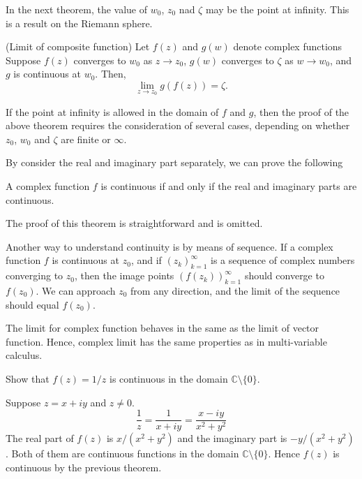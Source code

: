 In the next theorem, the value of $w_0$, $z_0$ nad $\zeta$ may be the point at infinity. This is a result on the Riemann sphere.

\begin{svgraybox}
	\begin{theorem} (Limit of composite function)
		Let $f(z)$ and $g(w)$ denote complex functions Suppose $f(z)$ converges to $w_0$ as $z\rightarrow z_0$, $g(w)$ converges to $\zeta$ as $w\rightarrow w_0$, and $g$ is continuous at $w_0$. Then, 
		$$
		\lim_{z\rightarrow z_0} g(f(z)) = \zeta.
		$$
	\end{theorem}
\end{svgraybox}

If the point at infinity is allowed in the domain of $f$ and $g$, then the proof of the above theorem requires the consideration of several cases, depending on whether $z_0$, $w_0$ and $\zeta$ are finite or $\infty$.

By consider the real and imaginary part separately, we can prove the following

\begin{svgraybox}
	\begin{theorem}
		A complex function $f$ is continuous if and only if the real and imaginary parts are continuous.
	\end{theorem}
\end{svgraybox}

The proof of this theorem is straightforward and is omitted.

Another way to understand continuity is by means of sequence. If a complex function $f$ is continuous at $z_0$, and if $(z_k)_{k=1}^\infty$ is a sequence of complex numbers converging to $z_0$, then the image points $(f(z_k))_{k=1}^\infty$ should converge to $f(z_0)$. We can approach $z_0$ from any direction, and the limit of the sequence should equal $f(z_0)$.




The limit for complex function behaves in the same as the limit of vector function. Hence, complex limit has the same properties as in multi-variable calculus.  







\begin{example} Show that $f(z) = 1/z$ is continuous in the domain $\mathbb{C}\setminus\{0\}$.
	
	Suppose $z=x+iy$ and $z\neq 0$.
	\[
	\frac{1}{z} = \frac{1}{x+iy} 
	= \frac{x-iy}{x^2+y^2} 
	\]
	The real part of $f(z)$ is $x/(x^2+y^2)$ and the imaginary part is $-y/(x^2+y^2)$. Both of them are continuous functions in the domain $\mathbb{C}\setminus\{0\}$. Hence $f(z)$ is continuous by the previous theorem.
\end{example}


